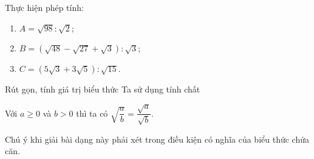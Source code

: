 \begin{vd}
    Thực hiện phép tính:
    \begin{multicols}{2}
    	\begin{enumerate}
    		\item $ A=\sqrt{98}\colon\sqrt{2} $;
    		\item $ B=\left(\sqrt{48}-\sqrt{27}+\sqrt{3}\right)\colon \sqrt{3} $;
    		\item $ C=\left(5\sqrt{3}+3\sqrt{5}\right)\colon\sqrt{15}. $
    	\end{enumerate}
    \end{multicols}
\end{vd}
\begin{dang}{Rút gọn, tính giá trị biểu thức}
    Ta sử dụng tính chất
    \begin{center}
    	Với $ a \ge 0 $ và $ b >0 $ thì ta có $ \sqrt{\dfrac{a}{b}} = \dfrac{\sqrt{a}}{\sqrt{b}} $.
    \end{center}
    \begin{note}
        Chú ý khi giải bài dạng này phải xét trong điều kiện có nghĩa của biểu thức chứa căn.
    \end{note}
\end{dang}

